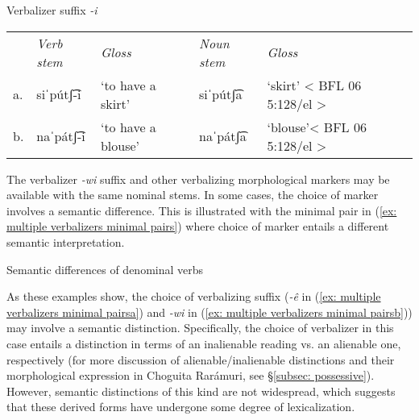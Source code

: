 \ea\label{ex: denominal verbs with -i}
{Verbalizer suffix \textit{-i}}
\setlength{\tabcolsep}{3pt}
\begin{tabular}{lllll}
       & \textit{Verb stem} & \textit{Gloss} & \textit{Noun stem} & \textit{Gloss} \\
     a.& siˈpútʃ͡-i&{‘to have a skirt'}&{siˈpútʃ͡a}&{‘skirt' < BFL 06 5:128/el >}\\
     b.& naˈpátʃ͡-i&{‘to have a blouse'}&{naˈpátʃ͡a}& {‘blouse'}{< BFL 06 5:128/el >}\\
\end{tabular}
    \z

The verbalizer \textit{-wi} suffix and other verbalizing morphological markers may be available with the same nominal stems. In some cases, the choice of marker involves a semantic difference. This is illustrated with the minimal pair in (\ref{ex: multiple verbalizers minimal pairs}) where choice of marker entails a different semantic interpretation.

\newpage
\ea\label{ex: multiple verbalizers minimal pairs}
{Semantic differences of denominal verbs}

    \label{ex: multiple verbalizers minimal pairsa}
        \label{ex: multiple verbalizers minimal pairsb}
            \label{ex: multiple verbalizers minimal pairsc}
    \z
\z

As these examples show, the choice of verbalizing suffix (\textit{-ê} in (\ref{ex: multiple verbalizers minimal pairsa}) and \textit{-wi} in (\ref{ex: multiple verbalizers minimal pairsb})) may involve a semantic distinction. Specifically, the choice of verbalizer in this case entails a distinction in terms of an inalienable reading vs. an alienable one, respectively (for more discussion of alienable/inalienable distinctions and their morphological expression in Choguita Rarámuri, see §\ref{subsec: possessive}). However, semantic distinctions of this kind are not widespread, which suggests that these derived forms have undergone some degree of lexicalization.


